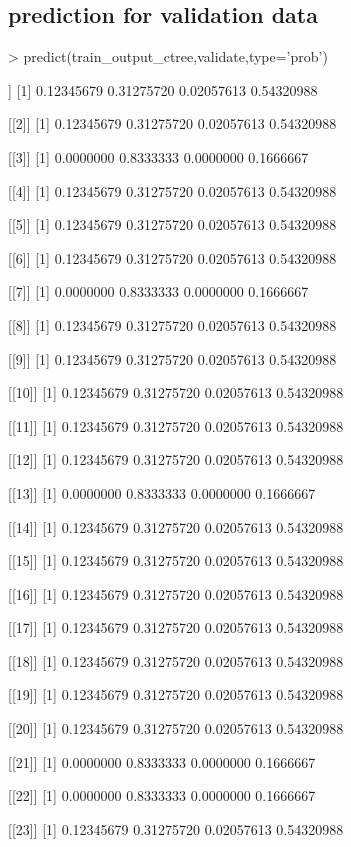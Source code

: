 \documentclass{article}
\begin{document}
\subsection*{prediction for validation data}
\begin{Schunk}
\begin{Sinput}
> predict(train_output_ctree,validate,type='prob')
\end{Sinput}
\begin{Soutput}
[[1]]
[1] 0.12345679 0.31275720 0.02057613 0.54320988

[[2]]
[1] 0.12345679 0.31275720 0.02057613 0.54320988

[[3]]
[1] 0.0000000 0.8333333 0.0000000 0.1666667

[[4]]
[1] 0.12345679 0.31275720 0.02057613 0.54320988

[[5]]
[1] 0.12345679 0.31275720 0.02057613 0.54320988

[[6]]
[1] 0.12345679 0.31275720 0.02057613 0.54320988

[[7]]
[1] 0.0000000 0.8333333 0.0000000 0.1666667

[[8]]
[1] 0.12345679 0.31275720 0.02057613 0.54320988

[[9]]
[1] 0.12345679 0.31275720 0.02057613 0.54320988

[[10]]
[1] 0.12345679 0.31275720 0.02057613 0.54320988

[[11]]
[1] 0.12345679 0.31275720 0.02057613 0.54320988

[[12]]
[1] 0.12345679 0.31275720 0.02057613 0.54320988

[[13]]
[1] 0.0000000 0.8333333 0.0000000 0.1666667

[[14]]
[1] 0.12345679 0.31275720 0.02057613 0.54320988

[[15]]
[1] 0.12345679 0.31275720 0.02057613 0.54320988

[[16]]
[1] 0.12345679 0.31275720 0.02057613 0.54320988

[[17]]
[1] 0.12345679 0.31275720 0.02057613 0.54320988

[[18]]
[1] 0.12345679 0.31275720 0.02057613 0.54320988

[[19]]
[1] 0.12345679 0.31275720 0.02057613 0.54320988

[[20]]
[1] 0.12345679 0.31275720 0.02057613 0.54320988

[[21]]
[1] 0.0000000 0.8333333 0.0000000 0.1666667

[[22]]
[1] 0.0000000 0.8333333 0.0000000 0.1666667

[[23]]
[1] 0.12345679 0.31275720 0.02057613 0.54320988


\end{Soutput}
\end{Schunk}
\end{document}
